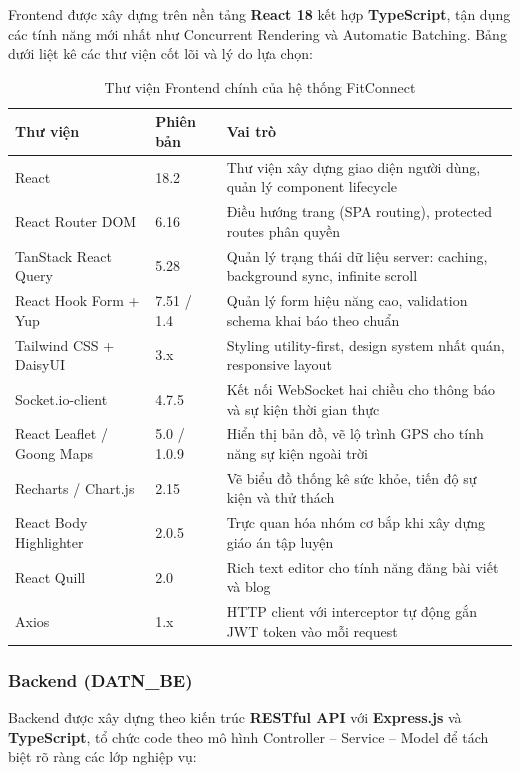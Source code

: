 Frontend được xây dựng trên nền tảng \textbf{React 18} kết hợp \textbf{TypeScript}, tận dụng các tính năng mới nhất như Concurrent Rendering và Automatic Batching. Bảng dưới liệt kê các thư viện cốt lõi và lý do lựa chọn:

\begin{table}[H]
\centering
\caption{Thư viện Frontend chính của hệ thống FitConnect}
\label{tab:impl_fe_libs}
\begin{tabular}{|p{4.5cm}|p{2cm}|p{7.5cm}|}
\hline
\textbf{Thư viện} & \textbf{Phiên bản} & \textbf{Vai trò} \\
\hline
React & 18.2 & Thư viện xây dựng giao diện người dùng, quản lý component lifecycle \\
\hline
React Router DOM & 6.16 & Điều hướng trang (SPA routing), protected routes phân quyền \\
\hline
TanStack React Query & 5.28 & Quản lý trạng thái dữ liệu server: caching, background sync, infinite scroll \\
\hline
React Hook Form + Yup & 7.51 / 1.4 & Quản lý form hiệu năng cao, validation schema khai báo theo chuẩn \\
\hline
Tailwind CSS + DaisyUI & 3.x & Styling utility-first, design system nhất quán, responsive layout \\
\hline
Socket.io-client & 4.7.5 & Kết nối WebSocket hai chiều cho thông báo và sự kiện thời gian thực \\
\hline
React Leaflet / Goong Maps & 5.0 / 1.0.9 & Hiển thị bản đồ, vẽ lộ trình GPS cho tính năng sự kiện ngoài trời \\
\hline
Recharts / Chart.js & 2.15 & Vẽ biểu đồ thống kê sức khỏe, tiến độ sự kiện và thử thách \\
\hline
React Body Highlighter & 2.0.5 & Trực quan hóa nhóm cơ bắp khi xây dựng giáo án tập luyện \\
\hline
React Quill & 2.0 & Rich text editor cho tính năng đăng bài viết và blog \\
\hline
Axios & 1.x & HTTP client với interceptor tự động gắn JWT token vào mỗi request \\
\hline
\end{tabular}
\end{table}

\subsubsection{Backend (DATN\_BE)}
\label{subsubsec:impl_be_libs}

Backend được xây dựng theo kiến trúc \textbf{RESTful API} với \textbf{Express.js} và \textbf{TypeScript}, tổ chức code theo mô hình Controller -- Service -- Model để tách biệt rõ ràng các lớp nghiệp vụ:

